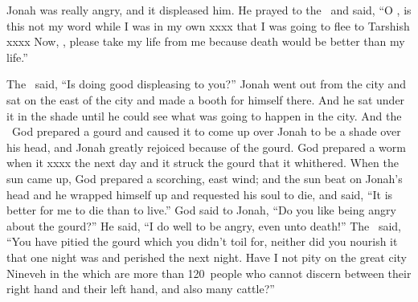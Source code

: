 
\begin{inparaenum}
   Jonah was really angry, and it displeased him.%
   He prayed to the \lord\ and said, ``O \lord, is this not my word while I was in my own xxxx that I was going to flee to Tarshish xxxx%
   Now, \lord, please take my life from me because death would be better than my life.''%

   The \lord\ said, ``Is doing good displeasing to you?''%
   Jonah went out from the city and sat on the east of the city and made a booth for himself there. And he sat under it in the shade until he could see what was going to happen in the city.%
   And the \lord\ God prepared a gourd and caused it to come up over Jonah to be a shade over his head, and Jonah greatly rejoiced because of the gourd.%
   God prepared a worm when it xxxx the next day and it struck the gourd that it whithered.%
   When the sun came up, God prepared a scorching, east wind; and the sun beat on Jonah's head and he wrapped himself up and requested his soul to die, and said, ``It is better for me to die than to live.''%
   God said to Jonah, ``Do you like being angry about the gourd?'' He said, ``I do well to be angry, even unto death!''%
   The \lord\ said, ``You have pitied the gourd which you didn't toil for, neither did you nourish it that one night was and perished the next night.%
   Have I not pity on the great city Nineveh in the which are more than 120~people who cannot discern between their right hand and their left hand, and also many cattle?''%
\end{inparaenum}
